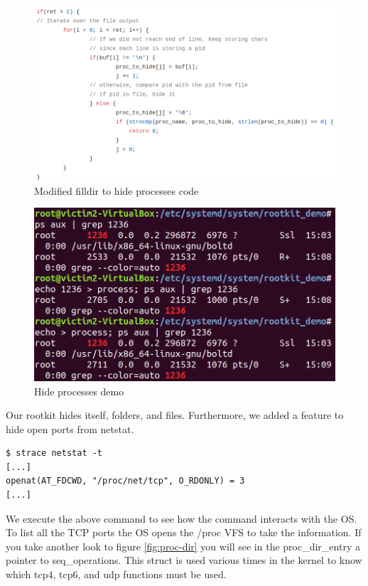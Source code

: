 \documentclass[11pt, a4paper,twoside]{tesi_upf}
\begin{document}
\begin{figure}
    \centering
    \includegraphics[width=\linewidth]{images/hide-proc-fopr.png}
    \caption{Modified filldir to hide processes code}
    \label{fig:filldir-hijacked-proc}
\end{figure}

\begin{figure}
    \centering
    \includegraphics[scale=0.5]{images/hide-process.png}
    \caption{Hide processes demo}
    \label{fig:filldir-hijacked-proc-demo}
\end{figure}
\newpage
Our rootkit hides itself, folders, and files. Furthermore, we added a feature to hide open ports from netstat.

\begin{lstlisting}
$ strace netstat -t
[...]
openat(AT_FDCWD, "/proc/net/tcp", O_RDONLY) = 3
[...]
\end{lstlisting}

We execute the above command to see how the command interacts with the OS. To list all the TCP ports the OS opens the /proc VFS to take the information. If you take another look to figure \ref{fig:proc-dir} you will see in the proc\_dir\_entry a pointer to seq\_operations. This struct is used various times in the kernel to know which tcp4, tcp6, and udp functions must be used.
\end{document}

